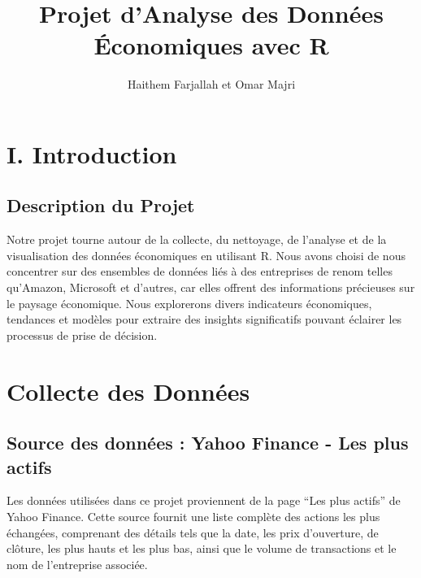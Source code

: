 \documentclass[
  letterpaper,
  DIV=11,
  numbers=noendperiod]{scrartcl}
\title{Projet d'Analyse des Données Économiques avec R}
\author{Haithem Farjallah et Omar Majri}
\date{}
\renewcommand*\contentsname{Table of contents}
\newcommand\contentsname{Table of contents}
\begin{document}
\maketitle
\ifdefined\Shaded\renewenvironment{Shaded}{\begin{tcolorbox}[interior hidden, boxrule=0pt, borderline west={3pt}{0pt}{shadecolor}, sharp corners, breakable, frame hidden, enhanced]}{\end{tcolorbox}}\fi

\renewcommand*\contentsname{Table of contents}
{
\hypersetup{linkcolor=}
\setcounter{tocdepth}{3}
\tableofcontents
}
\hypertarget{i.-introduction}{%
\section{I. Introduction}\label{i.-introduction}}

\hypertarget{description-du-projet}{%
\subsection{Description du Projet}\label{description-du-projet}}

Notre projet tourne autour de la collecte, du nettoyage, de l'analyse et
de la visualisation des données économiques en utilisant R. Nous avons
choisi de nous concentrer sur des ensembles de données liés à des
entreprises de renom telles qu'Amazon, Microsoft et d'autres, car elles
offrent des informations précieuses sur le paysage économique. Nous
explorerons divers indicateurs économiques, tendances et modèles pour
extraire des insights significatifs pouvant éclairer les processus de
prise de décision.

\hypertarget{collecte-des-donnuxe9es}{%
\section{Collecte des Données}\label{collecte-des-donnuxe9es}}

\hypertarget{source-des-donnuxe9es-yahoo-finance---les-plus-actifs}{%
\subsection{Source des données : Yahoo Finance - Les plus
actifs}\label{source-des-donnuxe9es-yahoo-finance---les-plus-actifs}}

Les données utilisées dans ce projet proviennent de la page ``Les plus
actifs'' de Yahoo Finance. Cette source fournit une liste complète des
actions les plus échangées, comprenant des détails tels que la date, les
prix d'ouverture, de clôture, les plus hauts et les plus bas, ainsi que
le volume de transactions et le nom de l'entreprise associée.
\end{document}

